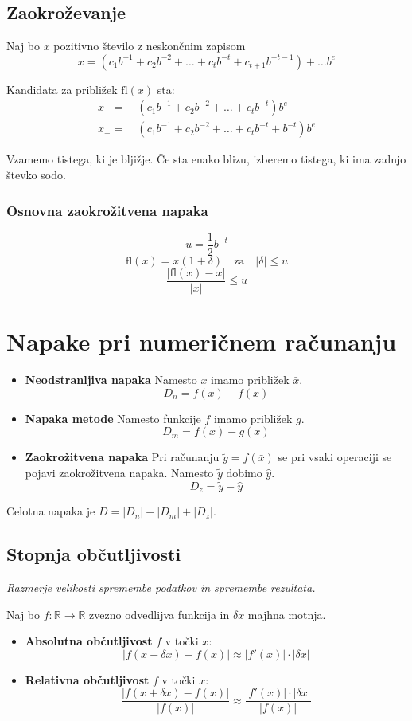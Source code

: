 \begin{multicols}{4}
\subsection{Zaokroževanje}
Naj bo $x$ pozitivno število z neskončnim zapisom
\[ x = (c_1 b^{-1} + c_2 b^{-2} + \dots + c_t b^{-t} + c_{t+1} b^{-t-1})  + \dots b^e \]

Kandidata za približek $\text{fl}(x)$ sta:
\begin{align*}
	x_- =&\ (c_1 b^{-1} + c_2 b^{-2} + \dots + c_t b^{-t}) b^e \\
	x_+ =&\ (c_1 b^{-1} + c_2 b^{-2} + \dots + c_t b^{-t} + b^{-t}) b^e
\end{align*}

Vzamemo tistega, ki je bljižje. Če sta enako blizu, izberemo tistega, ki ima zadnjo števko sodo.

\subsubsection{Osnovna zaokrožitvena napaka}
\[ u = \frac{1}{2} b^{-t} \]
\[ \text{fl}(x) = x(1+\delta) \quad \text{za} \quad |\delta| \leq u \]
\[ \frac{|\text{fl}(x) - x|}{|x|} \leq u\]

\section{Napake pri numeričnem računanju}
\begin{itemize}
	\item \textbf{Neodstranljiva napaka} Namesto $x$ imamo približek $\bar{x}$.
	\[ D_n = f(x) - f(\bar{x}) \]
	\item \textbf{Napaka metode} Namesto funkcije $f$ imamo približek $g$.
	\[ D_m = f(\bar{x}) - g(\bar{x})\]
	\item \textbf{Zaokrožitvena napaka} Pri računanju $\tilde{y} = f(\bar{x})$ se pri vsaki operaciji se pojavi zaokrožitvena napaka. Namesto $\tilde{y}$ dobimo $\hat{y}$.
	\[ D_z = \tilde{y} - \hat{y}\]
\end{itemize}

Celotna napaka je $D = |D_n| + |D_m| + |D_z|$.

\subsection{Stopnja občutljivosti}
\textit{Razmerje velikosti spremembe podatkov in spremembe rezultata.}

Naj bo $f: \mathbb{R} \to \mathbb{R}$ zvezno odvedlijva funkcija in $\delta x$ majhna motnja.
\begin{itemize}
	\item \textbf{Absolutna občutljivost} $f$ v točki $x$:
	\[ | f(x + \delta x) - f(x) | \approx |f'(x)| \cdot |\delta x| \]
	\item \textbf{Relativna občutljivost} $f$ v točki $x$:
	\[ \frac{| f(x + \delta x) - f(x) |}{|f(x)|} \approx \frac{|f'(x)| \cdot |\delta x|}{|f(x)|} \]
\end{itemize}


\end{multicols}

